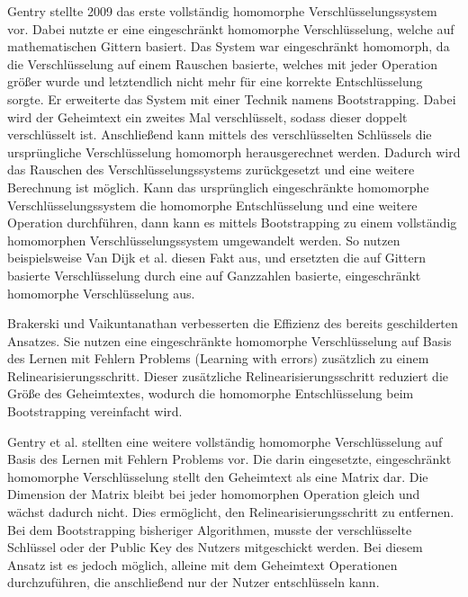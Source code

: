 Gentry \cite{P-40} stellte 2009 das erste vollständig homomorphe Verschlüsselungssystem vor.
Dabei nutzte er eine eingeschränkt homomorphe Verschlüsselung, welche auf mathematischen Gittern basiert.
Das System war eingeschränkt homomorph, da die Verschlüsselung auf einem Rauschen basierte, welches mit jeder Operation größer wurde und letztendlich nicht mehr für eine korrekte Entschlüsselung sorgte.
Er erweiterte das System mit einer Technik namens Bootstrapping.
Dabei wird der Geheimtext ein zweites Mal verschlüsselt, sodass dieser doppelt verschlüsselt ist.
Anschließend kann mittels des verschlüsselten Schlüssels die ursprüngliche Verschlüsselung homomorph herausgerechnet werden. 
Dadurch wird das Rauschen des Verschlüsselungssystems zurückgesetzt und eine weitere Berechnung ist möglich. 
Kann das ursprünglich eingeschränkte homomorphe Verschlüsselungssystem die homomorphe Entschlüsselung und eine weitere Operation durchführen, dann kann es mittels Bootstrapping zu einem vollständig homomorphen Verschlüsselungssystem umgewandelt werden.
So nutzen beispielsweise Van Dijk et al. \cite{P-100} diesen Fakt aus, und ersetzten die auf Gittern basierte Verschlüsselung durch eine auf Ganzzahlen basierte, eingeschränkt homomorphe Verschlüsselung aus. 

Brakerski und Vaikuntanathan \cite{P-101} verbesserten die Effizienz des bereits geschilderten Ansatzes.
Sie nutzen eine eingeschränkte homomorphe Verschlüsselung auf Basis des Lernen mit Fehlern Problems (Learning with errors) zusätzlich zu einem Relinearisierungsschritt.
Dieser zusätzliche Relinearisierungsschritt reduziert die Größe des Geheimtextes, wodurch die homomorphe Entschlüsselung beim Bootstrapping vereinfacht wird.

Gentry et al. \cite{P-102} stellten eine weitere vollständig homomorphe Verschlüsselung auf Basis des Lernen mit Fehlern Problems vor.
Die darin eingesetzte, eingeschränkt homomorphe Verschlüsselung stellt den Geheimtext als eine Matrix dar.
Die Dimension der Matrix bleibt bei jeder homomorphen Operation gleich und wächst dadurch nicht.
Dies ermöglicht, den Relinearisierungsschritt zu entfernen.
Bei dem Bootstrapping bisheriger Algorithmen, musste der verschlüsselte Schlüssel oder der Public Key des Nutzers mitgeschickt werden.
Bei diesem Ansatz ist es jedoch möglich, alleine mit dem Geheimtext Operationen durchzuführen, die anschließend nur der Nutzer entschlüsseln kann.


